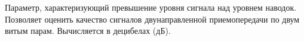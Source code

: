Параметр, характеризующий превышение уровня сигнала над
уровнем наводок. Позволяет оценить качество сигналов
двунаправленной приемопередачи по двум витым парам.
Вычисляется в децибелах (дБ).